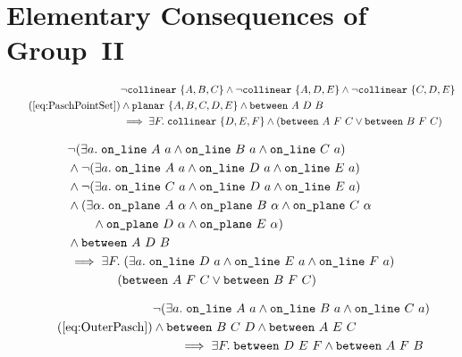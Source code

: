 \chapter{Elementary Consequences of Group~II}\label{app:Group2}

\begin{equation}
    \tag{\ref{eq:PaschPointSet}}
  \begin{aligned}
    &\neg\code{collinear}\ \{A,B,C\}\wedge\neg\code{collinear}\ \{A,D,E\}\wedge\neg\code{collinear}\ \{C,D,E\}\\
    &\wedge\code{planar}\ \{A,B,C,D,E\}\wedge\between{A}{D}{B}\\
    &\implies\exists F.\; \code{collinear}\ \{D,E,F\} \wedge (\between{A}{F}{C}\vee\between{B}{F}{C})
  \end{aligned} 
\end{equation}

\begin{equation}\label{eq:PaschPointSetUnfold}
  \begin{split}
    &\neg(\exists a.\; \texttt{on\_line}\ A\ a\wedge \texttt{on\_line}\ B\ a\wedge \texttt{on\_line}\ C\ a)\\
    &\wedge\neg(\exists a.\; \texttt{on\_line}\ A\ a\wedge \texttt{on\_line}\ D\ a\wedge \texttt{on\_line}\ E\ a)\\
    &\wedge\neg(\exists a.\; \texttt{on\_line}\ C\ a\wedge \texttt{on\_line}\ D\ a\wedge \texttt{on\_line}\ E\ a)\\
    &\wedge(\exists\alpha.\; \texttt{on\_plane}\ A\ \alpha\wedge \texttt{on\_plane}\ B\ \alpha\wedge \texttt{on\_plane}\ C\ \alpha\\
    &\qquad\wedge \texttt{on\_plane}\ D\ \alpha\wedge \texttt{on\_plane}\ E\ \alpha)\\
    &\wedge\texttt{between}\ A\ D\ B\\
    &\implies\exists F.\; (\exists a.\; \texttt{on\_line}\ D\ a\wedge \texttt{on\_line}\ E\ a\wedge \texttt{on\_line}\ F\ a)\\
    &\qquad\qquad (\texttt{between}\ A\ F\ C\vee\texttt{between}\ B\ F\ C)
  \end{split}
\end{equation}

\begin{equation}
  \tag{\ref{eq:OuterPasch}}
  \begin{split}
    &\Triangle{a}{A}{B}{C}\\ & \wedge \between{B}{C}{D} \wedge \between{A}{E}{C}\\ 
    &\qquad\implies \exists F.\; \between{D}{E}{F} \wedge \between{A}{F}{B}
  \end{split}
\end{equation}

